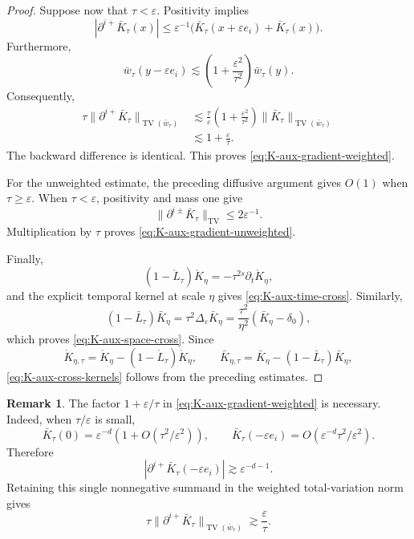 \documentclass{article}
\numberwithin{equation}{section}
\theoremstyle{plain}
\theoremstyle{definition}
\newtheorem{remark}[theorem]{Remark}
\begin{document}
\begin{proof}
	Suppose now that \(\tau<\varepsilon\).  Positivity implies
	\[
	|\partial^{i+}\bar K_\tau(x)|
	\leq
	\varepsilon^{-1}
	\bigl(
	\bar K_\tau(x+\varepsilon e_i)+\bar K_\tau(x)
	\bigr).
	\]
	Furthermore,
	\[
	\bar w_\tau(y-\varepsilon e_i)
	\lesssim
	\left(1+\frac{\varepsilon^2}{\tau^2}\right)
	\bar w_\tau(y).
	\]
	Consequently,
	\[
	\begin{aligned}
		\tau\|\partial^{i+}\bar K_\tau\|
		_{\operatorname{TV}(\bar w_\tau)}
		&\lesssim
		\frac{\tau}{\varepsilon}
		\left(1+\frac{\varepsilon^2}{\tau^2}\right)
		\|\bar K_\tau\|_{\operatorname{TV}(\bar w_\tau)}
		\\
		&\lesssim
		1+\frac{\varepsilon}{\tau}.
	\end{aligned}
	\]
	The backward difference is identical.  This proves
	\eqref{eq:K-aux-gradient-weighted}.
	
	For the unweighted estimate, the preceding diffusive argument gives
	\(O(1)\) when \(\tau\geq\varepsilon\).  When
	\(\tau<\varepsilon\), positivity and mass one give
	\[
	\|\partial^{i\pm}\bar K_\tau\|_{\operatorname{TV}}
	\leq2\varepsilon^{-1}.
	\]
	Multiplication by \(\tau\) proves
	\eqref{eq:K-aux-gradient-unweighted}.
	
	Finally,
	\[
		(1-\mathring L_\tau)\mathring K_\eta
	=
		-\tau^{2s}\partial_t\mathring K_\eta,
	\]
	and the explicit temporal kernel at scale \(\eta\) gives
	\eqref{eq:K-aux-time-cross}.  Similarly,
	\[
	(1-\bar L_\tau)\bar K_\eta
	=
	\tau^2\Delta_\varepsilon\bar K_\eta
	=
	\frac{\tau^2}{\eta^2}
	(\bar K_\eta-\delta_0),
	\]
	which proves \eqref{eq:K-aux-space-cross}.  Since
	\[
		\mathring K_{\eta,\tau}
		=
		\mathring K_\eta-(1-\mathring L_\tau)\mathring K_\eta,
	\qquad
	\bar K_{\eta,\tau}
	=
	\bar K_\eta-(1-\bar L_\tau)\bar K_\eta,
	\]
	\eqref{eq:K-aux-cross-kernels} follows from the preceding estimates.
\end{proof}

\begin{remark}
	The factor \(1+\varepsilon/\tau\) in
	\eqref{eq:K-aux-gradient-weighted} is necessary.  Indeed, when
	\(\tau/\varepsilon\) is small,
	\[
	\bar K_\tau(0)
	=
	\varepsilon^{-d}
	\left(
	1+O(\tau^2/\varepsilon^2)
	\right),
	\qquad
	\bar K_\tau(-\varepsilon e_i)
	=
	O\left(
	\varepsilon^{-d}\tau^2/\varepsilon^2
	\right).
	\]
	Therefore
	\[
	|\partial^{i+}\bar K_\tau(-\varepsilon e_i)|
	\gtrsim\varepsilon^{-d-1}.
	\]
	Retaining this single nonnegative summand in the weighted
	total-variation norm gives
	\[
	\tau\|\partial^{i+}\bar K_\tau\|
	_{\operatorname{TV}(\bar w_\tau)}
	\gtrsim\frac{\varepsilon}{\tau}.
	\]
\end{remark}
\end{document}
